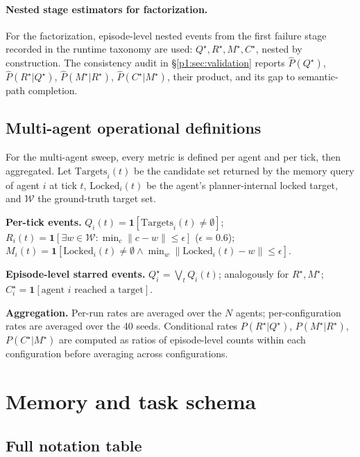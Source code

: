\documentclass{article}
\begin{document}
\paragraph{Nested stage estimators for factorization.}
For the factorization, episode-level nested events from the first failure stage recorded in the runtime taxonomy are used: $Q^\star, R^\star, M^\star, C^\star$, nested by construction. The consistency audit in \S\ref{p1:sec:validation} reports $\hat P(Q^\star)$, $\hat P(R^\star|Q^\star)$, $\hat P(M^\star|R^\star)$, $\hat P(C^\star|M^\star)$, their product, and its gap to semantic-path completion.

\subsection{Multi-agent operational definitions}
\label{p1:app:multi-agent-defs}

For the multi-agent sweep, every metric is defined per agent and per tick, then aggregated. Let $\mathrm{Targets}_i(t)$ be the candidate set returned by the memory query of agent $i$ at tick $t$, $\mathrm{Locked}_i(t)$ be the agent's planner-internal locked target, and $\mathcal{W}$ the ground-truth target set.

\textbf{Per-tick events.} $Q_i(t) = \mathbf{1}[\mathrm{Targets}_i(t) \ne \emptyset]$; $R_i(t) = \mathbf{1}[\exists w \in \mathcal{W}: \min_{c}\|c - w\| \le \epsilon]$ ($\epsilon = 0.6$); $M_i(t) = \mathbf{1}[\mathrm{Locked}_i(t) \ne \emptyset \land \min_w\|\mathrm{Locked}_i(t) - w\| \le \epsilon]$.

\textbf{Episode-level starred events.} $Q^\star_i = \bigvee_t Q_i(t)$; analogously for $R^\star, M^\star$; $C^\star_i = \mathbf{1}[\text{agent } i \text{ reached a target}]$.

\textbf{Aggregation.} Per-run rates are averaged over the $N$ agents; per-configuration rates are averaged over the 40 seeds. Conditional rates $P(R^\star|Q^\star)$, $P(M^\star|R^\star)$, $P(C^\star|M^\star)$ are computed as ratios of episode-level counts within each configuration before averaging across configurations.

\section{Memory and task schema}
\label{p1:app:schemas}

\subsection{Full notation table}
\label{p1:app:notation}
\end{document}
